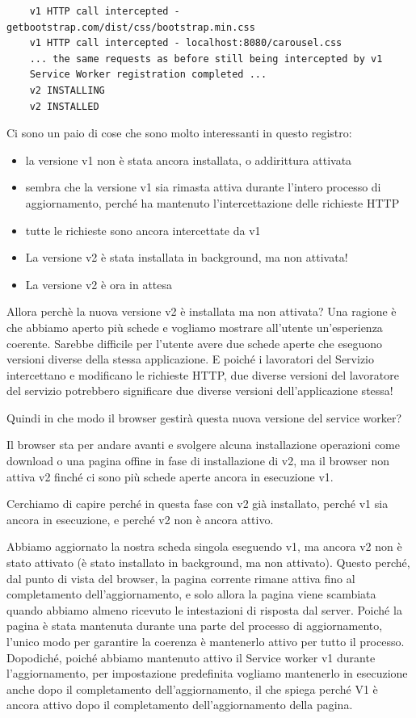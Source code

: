 \documentclass[italian]{article}
\begin{document}
\begin{lstlisting}
	v1 HTTP call intercepted - getbootstrap.com/dist/css/bootstrap.min.css
	v1 HTTP call intercepted - localhost:8080/carousel.css
	... the same requests as before still being intercepted by v1
	Service Worker registration completed ...
	v2 INSTALLING 
	v2 INSTALLED
\end{lstlisting}
Ci sono un paio di cose che sono molto interessanti in questo registro:
\begin{itemize}
\item la versione v1 non è stata ancora installata, o addirittura attivata
\item sembra che la versione v1 sia rimasta attiva durante l'intero processo di aggiornamento, perché ha mantenuto l'intercettazione delle richieste HTTP
\item tutte le richieste sono ancora intercettate da v1
\item La versione v2 è stata installata in background, ma non attivata!
\item La versione v2 è ora in attesa
\end{itemize}
Allora perchè la nuova versione v2 è installata ma non attivata?
Una ragione è che abbiamo aperto più schede e vogliamo mostrare all'utente un'esperienza coerente. Sarebbe difficile per l'utente avere due schede aperte che eseguono versioni diverse della stessa applicazione.
E poiché i lavoratori del Servizio intercettano e modificano le richieste HTTP, due diverse versioni del lavoratore del servizio potrebbero significare due diverse versioni dell'applicazione stessa!

Quindi in che modo il browser gestirà questa nuova versione del service worker?

Il browser sta per andare avanti e svolgere alcuna installazione operazioni come  download o una pagina offine in fase di installazione di v2, ma il browser non attiva v2 finché ci sono più schede aperte ancora in esecuzione v1.

Cerchiamo di capire perché in questa fase con v2 già installato, perché v1 sia ancora in esecuzione, e perché v2 non è ancora attivo.

Abbiamo aggiornato la nostra scheda singola eseguendo v1, ma ancora v2 non è stato attivato (è stato installato in background, ma non attivato). Questo perché, dal punto di vista del browser, la pagina corrente rimane attiva fino al completamento dell'aggiornamento, e solo allora la pagina viene scambiata quando abbiamo almeno ricevuto le intestazioni di risposta dal server. Poiché la pagina è stata mantenuta durante una parte del processo di aggiornamento, l'unico modo per garantire la coerenza è mantenerlo attivo per tutto il processo. Dopodiché, poiché abbiamo mantenuto attivo il Service worker v1 durante l'aggiornamento, per impostazione predefinita vogliamo mantenerlo in esecuzione anche dopo il completamento dell'aggiornamento, il che spiega perché V1 è ancora attivo dopo il completamento dell'aggiornamento della pagina.
\end{document}
